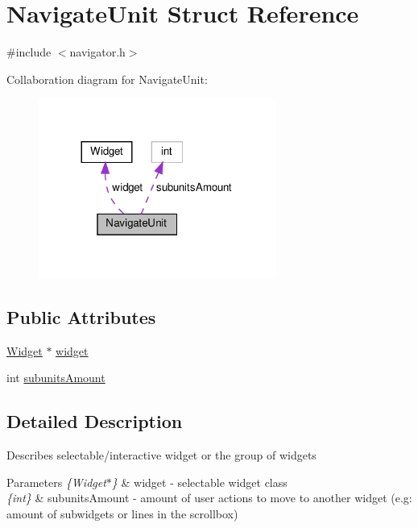 \hypertarget{struct_navigate_unit}{}\section{Navigate\+Unit Struct Reference}
\label{struct_navigate_unit}


{\ttfamily \#include $<$navigator.\+h$>$}



Collaboration diagram for Navigate\+Unit\+:
\nopagebreak
\begin{figure}[H]
\begin{center}
\leavevmode
\includegraphics[width=221pt]{struct_navigate_unit__coll__graph}
\end{center}
\end{figure}
\subsection*{Public Attributes}
\begin{DoxyCompactItemize}
\item 
\mbox{\hyperlink{class_widget}{Widget}} $\ast$ \mbox{\hyperlink{struct_navigate_unit_a04a97a78df45d0f2268b8352f64d43f5}{widget}}
\item 
int \mbox{\hyperlink{struct_navigate_unit_a59e42d03540ccad6017bc708cab71893}{subunits\+Amount}}
\end{DoxyCompactItemize}


\subsection{Detailed Description}
Describes selectable/interactive widget or the group of widgets 
\begin{DoxyParams}{Parameters}
{\em \{\+Widget$\ast$\}} & widget -\/ selectable widget class \\
\hline
{\em \{int\}} & subunits\+Amount -\/ amount of user actions to move to another widget (e.\+g\+: amount of subwidgets or lines in the scrollbox) \\
\hline
\end{DoxyParams}


